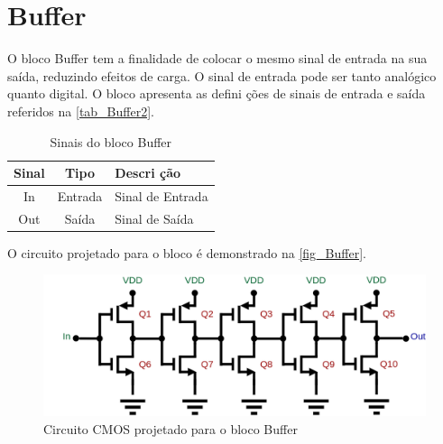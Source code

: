 \renewcommand{\NomeBloco}{Buffer}
\renewcommand{\NomePTab}{tab_\NomeBloco}
\renewcommand{\NomeSTab}{tab_\NomeBloco2}
\renewcommand{\NomePFig}{fig_\NomeBloco}
\renewcommand{\NomeSFig}{fig_\NomeBloco2}
\renewcommand{\NomeTTab}{tab_\NomeBloco3}

\section{Buffer}
\label{buffer}

O bloco \NomeBloco{} tem a finalidade de colocar o mesmo sinal de entrada na sua sa\'ida, reduzindo efeitos de carga. O sinal de entrada pode ser tanto anal\'ogico quanto digital. O bloco apresenta as defini ções de sinais de entrada e sa\'ida referidos na \autoref{\NomeSTab}.

\begin{table}[htb]
\caption{Sinais do bloco \NomeBloco}
\label{\NomeSTab}
\centering
\begin{tabular}{ccl}

    \toprule
    Sinal & Tipo    & Descri ção        \\
    \midrule \midrule
    In    & Entrada & Sinal de Entrada \\
    \midrule
    Out   & Saída   & Sinal de Sa\'ida   \\
    \bottomrule
\end{tabular}
\end{table}

O circuito projetado para o bloco \'e demonstrado na \autoref{\NomePFig}.

\begin{figure}[htb]
 \label{NomePFig}
 \centering
    \caption{Circuito CMOS projetado para o bloco \NomeBloco} \label{\NomePFig}
    \includegraphics[scale=0.3]{Circuitos/Buffer.png}
\end{figure}

